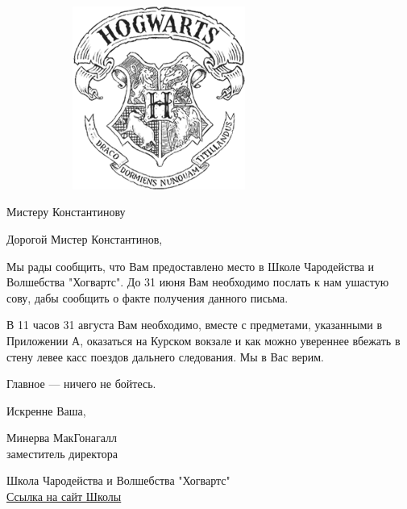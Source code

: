 \documentclass{report}
\begin{document}

\pagestyle{empty}

\begin{center}
\includegraphics[width=10cm, height=6cm, keepaspectratio]{hogwarts.png}
\end{center}

\vspace{1cm}

{\fontsize{12}{1}\selectfont Мистеру Константинову}

\vspace{2.5cm}

Дорогой Мистер Константинов, 

Мы рады сообщить, что Вам предоставлено место в Школе Чародейства и Волшебства "Хогвартс". До 31 июня Вам необходимо послать к нам ушастую сову, дабы сообщить о факте получения данного письма. 

В 11 часов 31 августа Вам необходимо, вместе с предметами, указанными в Приложении А, оказаться на Курском вокзале и как можно увереннее вбежать в стену левее касс поездов дальнего следования. Мы в Вас верим.

Главное --- ничего не бойтесь.

Искренне Ваша,

{\fontsize{20}{1}\selectfont{}}

Минерва МакГонагалл \\
заместитель директора

\vfill 
\begin{center} 
Школа Чародейства и Волшебства "Хогвартс" \\ 
{\fontsize{12}{1}\selectfont \href{http://synergy.ru/}{Ссылка на сайт Школы}} 
\end{center}

\newpage

\pagestyle{fancy}
\end{document}
